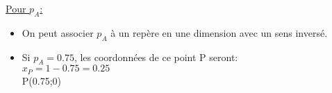 \documentclass[10pt]{article}
\begin{document}
\begin{minipage}{.43\textwidth}

        \hspace{.5cm} \uline{Pour $p_{A}$:} \\[.125cm]

        \begin{itemize}

                \item On peut associer $p_{A}$ à un repère en une dimension avec un sens inversé. \\[.25cm]

        \end{itemize}

        \begin{itemize}

                \item Si $p_{A} = 0.75$, les coordonnées de ce point P seront: \\[.125cm]

                $x_{P} = 1 - 0.75 = 0.25$ \\[.125cm]

                P(0.75;0)

        \end{itemize}

\end{minipage}%
\end{document}
